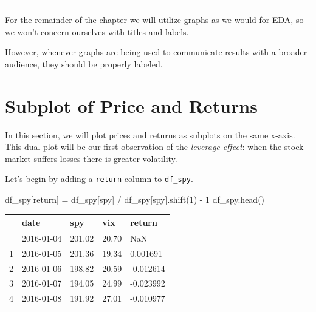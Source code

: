 \documentclass[
  letterpaper,
  DIV=11,
  numbers=noendperiod]{scrreprt}
\newenvironment{Shaded}{\begin{snugshade}}{\end{snugshade}}
\newcommand{\DecValTok}[1]{\textcolor[rgb]{0.68,0.00,0.00}{#1}}
\newcommand{\NormalTok}[1]{\textcolor[rgb]{0.00,0.23,0.31}{#1}}
\newcommand{\OperatorTok}[1]{\textcolor[rgb]{0.37,0.37,0.37}{#1}}
\newcommand{\StringTok}[1]{\textcolor[rgb]{0.13,0.47,0.30}{#1}}
\begin{document}
\begin{center}\rule{0.5\linewidth}{0.5pt}\end{center}

For the remainder of the chapter we will utilize graphs as we would for
EDA, so we won't concern ourselves with titles and labels.

However, whenever graphs are being used to communicate results with a
broader audience, they should be properly labeled.

\hypertarget{subplot-of-price-and-returns}{%
\section{Subplot of Price and
Returns}\label{subplot-of-price-and-returns}}

In this section, we will plot prices and returns as subplots on the same
x-axis. This dual plot will be our first observation of the
\emph{leverage effect}: when the stock market suffers losses there is
greater volatility.

Let's begin by adding a \texttt{return} column to \texttt{df\_spy}.

\begin{Shaded}
\begin{Highlighting}[]
\NormalTok{df\_spy[}\StringTok{\textquotesingle{}return\textquotesingle{}}\NormalTok{] }\OperatorTok{=}\NormalTok{ df\_spy[}\StringTok{\textquotesingle{}spy\textquotesingle{}}\NormalTok{] }\OperatorTok{/}\NormalTok{ df\_spy[}\StringTok{\textquotesingle{}spy\textquotesingle{}}\NormalTok{].shift(}\DecValTok{1}\NormalTok{) }\OperatorTok{{-}} \DecValTok{1}
\NormalTok{df\_spy.head()}
\end{Highlighting}
\end{Shaded}

\begin{longtable}[]{@{}lllll@{}}
\toprule\noalign{}
& date & spy & vix & return \\
\midrule\noalign{}
\endhead
\bottomrule\noalign{}
\endlastfoot
0 & 2016-01-04 & 201.02 & 20.70 & NaN \\
1 & 2016-01-05 & 201.36 & 19.34 & 0.001691 \\
2 & 2016-01-06 & 198.82 & 20.59 & -0.012614 \\
3 & 2016-01-07 & 194.05 & 24.99 & -0.023992 \\
4 & 2016-01-08 & 191.92 & 27.01 & -0.010977 \\
\end{longtable}
\end{document}

